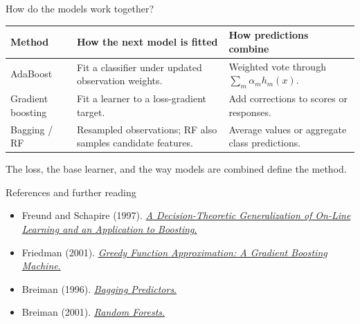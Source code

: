 \begin{frame}[t]{How do the models work together?}
\small\renewcommand{\arraystretch}{1.35}
\begin{tabularx}{\textwidth}{@{}p{}YY@{}}
\toprule
\textbf{Method}&\textbf{How the next model is fitted}&\textbf{How predictions combine}\\\midrule
AdaBoost&Fit a classifier under updated observation weights.&Weighted vote through $\sum_m\alpha_m h_m(x)$.\\[5pt]
Gradient boosting&Fit a learner to a loss-gradient target.&Add corrections to scores or responses.\\[5pt]
Bagging / RF&Resampled observations; RF also samples candidate features.&Average values or aggregate class predictions.\\\bottomrule
\end{tabularx}
\vspace{.15cm}\begin{takeaway}The loss, the base learner, and the way models are combined define the method.\end{takeaway}
\end{frame}

\begin{frame}[t]{References and further reading}
\small
\begin{itemize}\setlength{\itemsep}{.15cm}
\item Freund and Schapire (1997). \href{https://doi.org/10.1006/jcss.1997.1504}{\textit{A Decision-Theoretic Generalization of On-Line Learning and an Application to Boosting}.}
\item Friedman (2001). \href{https://doi.org/10.1214/aos/1013203451}{\textit{Greedy Function Approximation: A Gradient Boosting Machine}.}
\item Breiman (1996). \href{https://statistics.berkeley.edu/tech-reports/421}{\textit{Bagging Predictors}.}
\item Breiman (2001). \href{https://www.stat.berkeley.edu/~breiman/randomforest2001.pdf}{\textit{Random Forests}.}
\end{itemize}
\end{frame}
